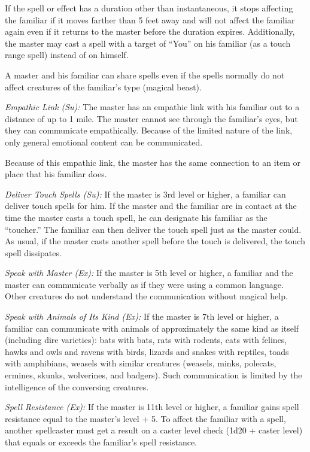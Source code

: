 \documentclass{article}
\begin{document}
If the spell or effect has a duration other than instantaneous, it stops affecting 
the familiar if it moves farther than 5 feet away and will not affect the familiar 
again even if it returns to the master before the duration expires. Additionally, 
the master may cast a spell with a target of ``You'' on his familiar (as a touch 
range spell) instead of on himself.

A master and his familiar can share spells even if the spells normally do not affect 
creatures of the familiar's type (magical beast).

\textit{Empathic Link (Su): }The master has an empathic link with his familiar 
out to a distance of up to 1 mile. The master cannot see through the familiar's 
eyes, but they can communicate empathically. Because of the limited nature of the 
link, only general emotional content can be communicated.

Because of this empathic link, the master has the same connection to an item or 
place that his familiar does.

\textit{Deliver Touch Spells (Su): }If the master is 3rd level or higher, a familiar 
can deliver touch spells for him. If the master and the familiar are in contact 
at the time the master casts a touch spell, he can designate his familiar as the 
``toucher.'' The familiar can then deliver the touch spell just as the master could. 
As usual, if the master casts another spell before the touch is delivered, the 
touch spell dissipates.

\textit{Speak with Master (Ex): }If the master is 5th level or higher, a familiar 
and the master can communicate verbally as if they were using a common language. 
Other creatures do not understand the communication without magical help.

\textit{Speak with Animals of Its Kind (Ex): }If the master is 7th level or higher, 
a familiar can communicate with animals of approximately the same kind as itself 
(including dire varieties): bats with bats, rats with rodents, cats with felines, 
hawks and owls and ravens with birds, lizards and snakes with reptiles, toads with 
amphibians, weasels with similar creatures (weasels, minks, polecats, ermines, 
skunks, wolverines, and badgers). Such communication is limited by the intelligence 
of the conversing creatures.

\textit{Spell Resistance (Ex): }If the master is 11th level or higher, a familiar 
gains spell resistance equal to the master's level + 5. To affect the familiar 
with a spell, another spellcaster must get a result on a caster level check (1d20 
+ caster level) that equals or exceeds the familiar's spell resistance.
\end{document}
